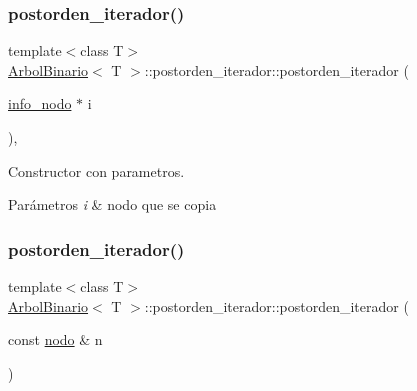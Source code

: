 \subsubsection{\texorpdfstring{postorden\+\_\+iterador()}{postorden\_iterador()}\hspace{0.1cm}{\footnotesize\ttfamily [1/3]}}
{\footnotesize\ttfamily template$<$class T$>$ \\
\hyperlink{classArbolBinario}{Arbol\+Binario}$<$ T $>$\+::postorden\+\_\+iterador\+::postorden\+\_\+iterador (\begin{DoxyParamCaption}\item[{\hyperlink{structArbolBinario_1_1info__nodo}{info\+\_\+nodo} $\ast$}]{i }\end{DoxyParamCaption})\hspace{0.3cm}{\ttfamily [inline]}, {\ttfamily [private]}}



Constructor con parametros. 


\begin{DoxyParams}{Parámetros}
{\em i} & nodo que se copia \\
\hline
\end{DoxyParams}
\mbox{\label{classArbolBinario_1_1postorden__iterador_a9eb37bb1b877b1c297889680055ace86}} 
\subsubsection{\texorpdfstring{postorden\+\_\+iterador()}{postorden\_iterador()}\hspace{0.1cm}{\footnotesize\ttfamily [2/3]}}
{\footnotesize\ttfamily template$<$class T$>$ \\
\hyperlink{classArbolBinario}{Arbol\+Binario}$<$ T $>$\+::postorden\+\_\+iterador\+::postorden\+\_\+iterador (\begin{DoxyParamCaption}\item[{const \hyperlink{classArbolBinario_1_1nodo}{nodo} \&}]{n }\end{DoxyParamCaption})\hspace{0.3cm}{\ttfamily [inline]}}



